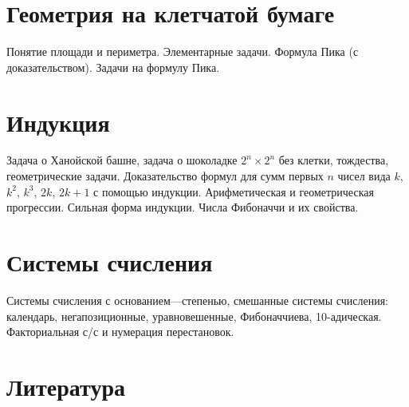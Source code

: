 \documentclass[a4paper,11pt,landscape]{article}
\begin{document}
\begin{paracol}{2}

\setlength{\columnsep}{0.9cm}

\setcounter{section}{12}

\section{Геометрия на клетчатой бумаге}

Понятие площади и периметра. Элементарные задачи. Формула Пика (с доказательством). Задачи на формулу Пика.

\section{Индукция}

Задача о Ханойской башне, задача о шоколадке $2^n \times 2^n$ без клетки, тождества, геометрические задачи. Доказательство формул для сумм первых $n$ чисел вида $k$, $k^2$\!, $k^3$\!, $2k$, $2k+1$ с помощью индукции. Арифметическая и геометрическая прогрессии. Сильная форма индукции. Числа Фибоначчи и их свойства.

\section{Системы счисления}

Системы счисления с основанием—степенью, смешанные системы счисления: календарь, негапозиционные, уравновешенные, Фибоначчиева, 10-адическая. Факториальная с/с и нумерация перестановок.

\switchcolumn

\section*{Литература}

\end{paracol}
\end{document}
